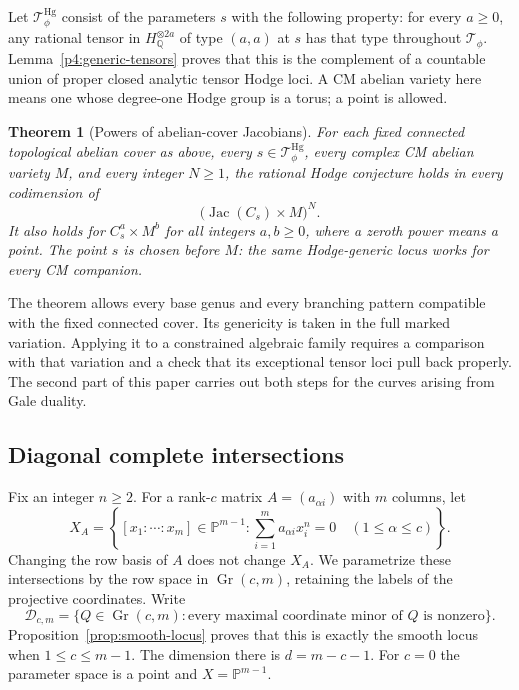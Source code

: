 \documentclass[11pt]{article}
\newcommand{\Q}{\mathbb Q}
\newcommand{\PP}{\mathbb P}
\newcommand{\Gr}{\operatorname{Gr}}
\newcommand{\Jac}{\operatorname{Jac}}
\newcommand{\D}{\mathcal D}
\theoremstyle{plain}
\newtheorem{theorem}{Theorem}[section]
\theoremstyle{definition}
\theoremstyle{remark}
\numberwithin{equation}{section}
\begin{document}
Let \(\mathcal T_\phi^{\mathrm{Hg}}\) consist of the parameters \(s\)
with the following property: for every \(a\geq0\), any rational tensor
in \(H_\Q^{\otimes 2a}\) of type \((a,a)\) at \(s\) has that type
throughout \(\mathcal T_\phi\).  Lemma~\ref{p4:generic-tensors} proves
that this is the complement of a countable union of proper closed
analytic tensor Hodge loci.  A CM abelian variety here means one whose
degree-one Hodge group is a torus; a point is allowed.

\begin{theorem}[Powers of abelian-cover Jacobians]
\label{p4:abelian-covers}
For each fixed connected topological abelian cover as above, every
\(s\in\mathcal T_\phi^{\mathrm{Hg}}\), every complex CM abelian variety
\(M\), and every integer \(N\geq1\), the rational Hodge conjecture holds
in every codimension of
\[
 \bigl(\Jac(C_s)\times M\bigr)^N.
\]
It also holds for \(C_s^a\times M^b\) for all integers \(a,b\geq0\),
where a zeroth power means a point.  The point \(s\) is chosen before
\(M\): the same Hodge-generic locus works for every CM companion.
\end{theorem}

The theorem allows every base genus and every branching pattern
compatible with the fixed connected cover.  Its genericity is taken in
the full marked variation.  Applying it to a constrained algebraic
family requires a comparison with that variation and a check that its
exceptional tensor loci pull back properly.  The second part of this
paper carries out both steps for the curves arising from Gale duality.

\subsection{Diagonal complete intersections}

Fix an integer \(n\geq2\).  For a rank-\(c\) matrix
\(A=(a_{\alpha i})\) with \(m\) columns, let
\[
 X_A=\left\{[x_1:\cdots:x_m]\in\PP^{m-1}:
       \sum_{i=1}^m a_{\alpha i}x_i^n=0
       \quad(1\leq\alpha\leq c)\right\}.
\]
Changing the row basis of \(A\) does not change \(X_A\).  We parametrize
these intersections by the row space in \(\Gr(c,m)\), retaining the
labels of the projective coordinates.  Write
\[
 \D_{c,m}=\{Q\in\Gr(c,m):\text{every maximal coordinate minor
 of \(Q\) is nonzero}\}.
\]
Proposition~\ref{prop:smooth-locus} proves that this is exactly the
smooth locus when \(1\leq c\leq m-1\).  The dimension there is
\(d=m-c-1\).  For \(c=0\) the parameter space is a point and
\(X=\PP^{m-1}\).
\end{document}
